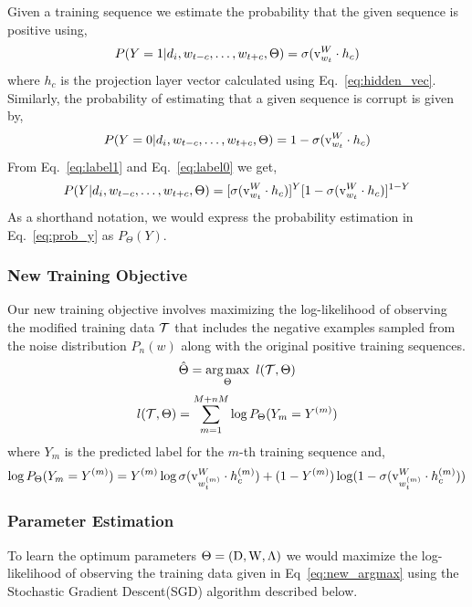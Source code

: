 Given a training sequence we estimate the probability that the given sequence is positive using,
\begin{equation}
\label{eq:label1}
P(Y=1|d_{i}, w_{t-c}, \ldots, w_{t+c}, \Theta) = \sigma(\mathrm{v}^{W}_{w_{t}} \cdot h_{c})
\end{equation}
where $h_{c}$ is the projection layer vector calculated using Eq.~\ref{eq:hidden_vec}. Similarly, the probability of estimating that a given sequence is corrupt is given by,
\begin{equation}
\label{eq:label0}
P(Y=0|d_{i}, w_{t-c}, \ldots, w_{t+c}, \Theta) = 1 - \sigma(\mathrm{v}^{W}_{w_{t}} \cdot h_{c})
\end{equation}
From Eq.~\ref{eq:label1} and Eq.~\ref{eq:label0} we get,
\begin{equation}
\label{eq:prob_y}
P(Y|d_{i}, w_{t-c}, \ldots, w_{t+c}, \Theta) = [\sigma(\mathrm{v}^{W}_{w_{t}} \cdot h_{c})]^{Y}[1 - \sigma(\mathrm{v}^{W}_{w_{t}} \cdot h_{c})]^{1-Y}
\end{equation}
As a shorthand notation, we would express the probability estimation in Eq.~\ref{eq:prob_y} as $P_{\Theta}(Y)$.

\subsubsection{New Training Objective}
Our new training objective involves maximizing the log-likelihood of observing the modified training data $\mathcal{T}$ that includes the negative examples sampled from the noise distribution $P_{n}(w)$ along with the original positive training sequences. 	
\begin{equation}
\label{eq:new_argmax}
\hat{\Theta} =  \operatorname*{arg\,max}_{\Theta}~l(\mathcal{T}, \Theta)
\end{equation}
\begin{equation}
\label{eq:new_training_objective}
l(\mathcal{T}, \Theta) = \sum_{m=1}^{M + nM} \log P_{\Theta}(Y_{m} = Y^{(m)})
\end{equation}
where $Y_{m}$ is the predicted label for the $m$-th training sequence and,
\begin{equation}
\label{eq:log_P}
\log P_{\Theta}(Y_{m} = Y^{(m)}) = Y^{(m)}\log \sigma(\mathrm{v}^{W}_{w^{(m)}_{t}} \cdot h^{(m)}_{c}) + (1 - Y^{(m)})\log (1 - \sigma(\mathrm{v}^{W}_{w^{(m)}_{t}} \cdot h^{(m)}_{c}))
\end{equation}

\subsubsection{Parameter Estimation}
\label{sec:para_esti_doc}
To learn the optimum parameters $\Theta = (\mathrm{D}, \mathrm{W}, \Lambda)$ we would maximize the log-likelihood of observing the training data given in Eq~\ref{eq:new_argmax} using the Stochastic Gradient Descent(SGD) algorithm described below. 

